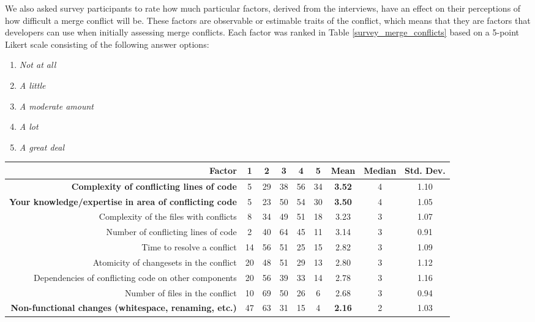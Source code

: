 We also asked survey participants to rate how much particular factors, derived from the interviews, have an effect on their perceptions of how difficult a merge conflict will be. These factors are observable or estimable traits of the conflict, which means that they are factors that developers can use when initially assessing merge conflicts.
Each factor was ranked in Table \ref{survey_merge_conflicts} based on a 5-point Likert scale consisting of the following answer options:

\begin{enumerate}
	\item \textit{Not at all}
	\item \textit{A little}
	\item \textit{A moderate amount}
	\item \textit{A lot}
	\item \textit{A great deal}
\end{enumerate}

\begin{table*}[!]
\renewcommand{\arraystretch}{1.3}
\caption{Factors of Merge Conflict Difficulty from Survey}
\label{survey_merge_conflicts}
\centering
\begin{tabularx}{0.9\textwidth}{r | *5{c} | *3{c}}

\toprule
	Factor & 1 & 2 & 3 & 4 & 5 & Mean & Median & Std. Dev. \\
\midrule
	\textbf{Complexity of conflicting lines of code} & 5 & 29 & 38 & 56 & 34 & \textbf{3.52} & 4 & 1.10 \\
	\textbf{Your knowledge/expertise in area of conflicting code} & 5 & 23 & 50 & 54 & 30 & \textbf{3.50} & 4 & 1.05 \\
	Complexity of the files with conflicts & 8 & 34 & 49 & 51 & 18 & 3.23 & 3 & 1.07 \\
	Number of conflicting lines of code & 2 & 40 & 64 & 45 & 11 & 3.14 & 3 & 0.91 \\
	Time to resolve a conflict & 14 & 56 & 51 & 25 & 15 & 2.82 & 3 & 1.09 \\
	Atomicity of changesets in the conflict & 20 & 48 & 51 & 29 & 13 & 2.80 & 3 & 1.12 \\
	Dependencies of conflicting code on other components & 20 & 56 & 39 & 33 & 14 & 2.78 & 3 & 1.16 \\
	Number of files in the conflict & 10 & 69 & 50 & 26 & 6 & 2.68 & 3 & 0.94 \\
	\textbf{Non-functional changes (whitespace, renaming, etc.)} & 47 & 63 & 31 & 15 & 4 & \textbf{2.16} & 2 & 1.03 \\
\bottomrule
\end{tabularx}
\end{table*}

